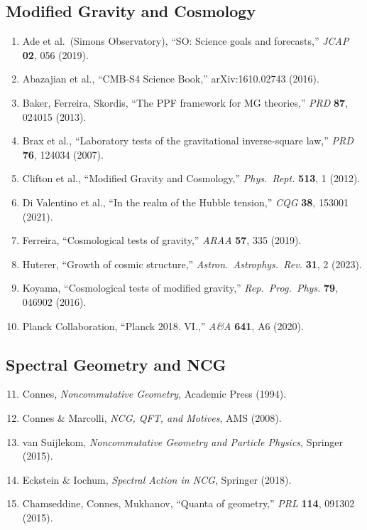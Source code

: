 \documentclass[11pt,a4paper]{article}
\begin{document}
\subsection{Modified Gravity and Cosmology}

\begin{enumerate}
\item Ade et al.\ (Simons Observatory), ``SO: Science goals and forecasts,'' \textit{JCAP} \textbf{02}, 056 (2019).
\item Abazajian et al., ``CMB-S4 Science Book,'' arXiv:1610.02743 (2016).
\item Baker, Ferreira, Skordis, ``The PPF framework for MG theories,'' \textit{PRD} \textbf{87}, 024015 (2013).
\item Brax et al., ``Laboratory tests of the gravitational inverse-square law,'' \textit{PRD} \textbf{76}, 124034 (2007).
\item Clifton et al., ``Modified Gravity and Cosmology,'' \textit{Phys.\ Rept.} \textbf{513}, 1 (2012).
\item Di Valentino et al., ``In the realm of the Hubble tension,'' \textit{CQG} \textbf{38}, 153001 (2021).
\item Ferreira, ``Cosmological tests of gravity,'' \textit{ARAA} \textbf{57}, 335 (2019).
\item Huterer, ``Growth of cosmic structure,'' \textit{Astron.\ Astrophys.\ Rev.} \textbf{31}, 2 (2023).
\item Koyama, ``Cosmological tests of modified gravity,'' \textit{Rep.\ Prog.\ Phys.} \textbf{79}, 046902 (2016).
\item Planck Collaboration, ``Planck 2018. VI.,'' \textit{A\&A} \textbf{641}, A6 (2020).
\end{enumerate}

\subsection{Spectral Geometry and NCG}

\begin{enumerate}
\setcounter{enumi}{10}
\item Connes, \textit{Noncommutative Geometry}, Academic Press (1994).
\item Connes \& Marcolli, \textit{NCG, QFT, and Motives}, AMS (2008).
\item van Suijlekom, \textit{Noncommutative Geometry and Particle Physics}, Springer (2015).
\item Eckstein \& Iochum, \textit{Spectral Action in NCG}, Springer (2018).
\item Chamseddine, Connes, Mukhanov, ``Quanta of geometry,'' \textit{PRL} \textbf{114}, 091302 (2015).
\end{enumerate}
\end{document}
